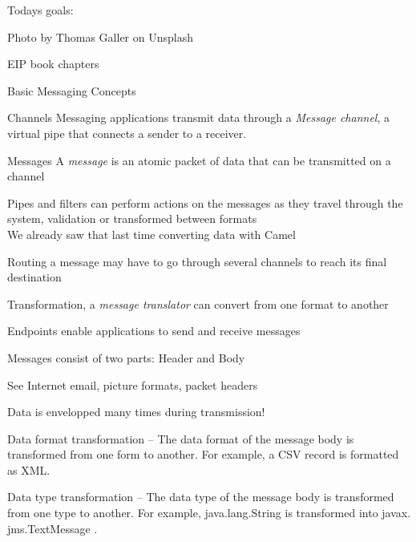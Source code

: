 \documentclass[Screen16to9,17pt]{foils}
\begin{document}


Todays goals:
\begin{list2}
\item
\item
\item
\end{list2}

Photo by Thomas Galler on Unsplash



EIP book chapters




Basic Messaging Concepts
\begin{list2}
\item Channels Messaging applications transmit data through a \emph{Message channel}, a virtual pipe that connects a sender to a receiver.
\item Messages A \emph{message} is an atomic packet of data that can be transmitted on a channel
\item Pipes and filters can perform actions on the messages as they travel through the system, validation or transformed between formats\\
We already saw that last time converting data with Camel
\item Routing a message may have to go through several channels to reach its final destination
\item Transformation, a \emph{message translator} can convert from one format to another
\item Endpoints enable applications to send and receive messages
\end{list2}



\begin{list2}
\item Messages consist of two parts: Header and Body
\item See Internet email, picture formats, packet headers
\item Data is envelopped many times during transmission!
\item Data format transformation -- The data format of the message body is transformed
from one form to another. For example, a CSV record is formatted as XML.
\item Data type transformation -- The data type of the message body is transformed from
one type to another. For example, java.lang.String is transformed into javax.
jms.TextMessage .
\end{list2}
\end{document}
